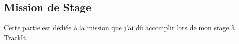 
\begin{coverpage}
  \chapter{Mission de Stage}

  Cette partie est dédiée à la mission
  que j'ai dû accomplir lors de mon stage
  à TrackIt.
\end{coverpage}
